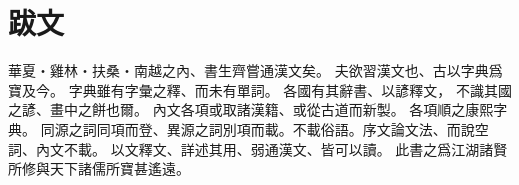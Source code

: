 \chapter*{跋文}
華夏・雞林・扶桑・南越之內、書生齊嘗通漢文矣。
夫欲習漢文也、古以字典爲寶及今。
字典雖有字彙之釋、而未有單詞。
各國有其辭書、以諺釋文，
不識其國之諺、畫中之餅也爾。
內文各項或取諸漢籍、或從古道而新製。
各項順之康熙字典。
同源之詞同項而登、異源之詞別項而載。不載俗語。序文論文法、而說空詞、內文不載。
以文釋文、詳述其用、弱通漢文、皆可以讀。
此書之爲江湖諸賢所修與天下諸儒所寶甚遙遠。
